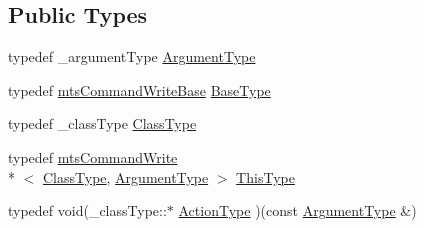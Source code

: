 \subsection*{Public Types}
\begin{DoxyCompactItemize}
\item 
typedef \-\_\-argument\-Type \hyperlink{classmts_command_write_aa8ff942dbc4caedb34d83a5d6bf47c10}{Argument\-Type}
\item 
typedef \hyperlink{classmts_command_write_base}{mts\-Command\-Write\-Base} \hyperlink{classmts_command_write_a40dcfd022c15b4411c0eb5d8fc670dcd}{Base\-Type}
\item 
typedef \-\_\-class\-Type \hyperlink{classmts_command_write_aeccc8c434133c4adae34916b42ad493c}{Class\-Type}
\item 
typedef \hyperlink{classmts_command_write}{mts\-Command\-Write}\\*
$<$ \hyperlink{classmts_command_write_aeccc8c434133c4adae34916b42ad493c}{Class\-Type}, \hyperlink{classmts_command_write_aa8ff942dbc4caedb34d83a5d6bf47c10}{Argument\-Type} $>$ \hyperlink{classmts_command_write_a629a4131789c13f5bca121ccc8370ae3}{This\-Type}
\item 
typedef void(\-\_\-class\-Type\-::$\ast$ \hyperlink{classmts_command_write_a1327ec4d03afcafbbbd91c8fc3f3c090}{Action\-Type} )(const \hyperlink{classmts_command_write_aa8ff942dbc4caedb34d83a5d6bf47c10}{Argument\-Type} \&)
\end{DoxyCompactItemize}
